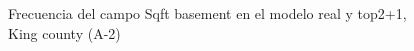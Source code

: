 \begin{figure}[H]
    \centering
    
    \caption{Frecuencia del campo Sqft basement en el modelo real y top2+1, King county (A-2)}
    \label{frecuency-top2+1-sqft basement}
\end{figure}